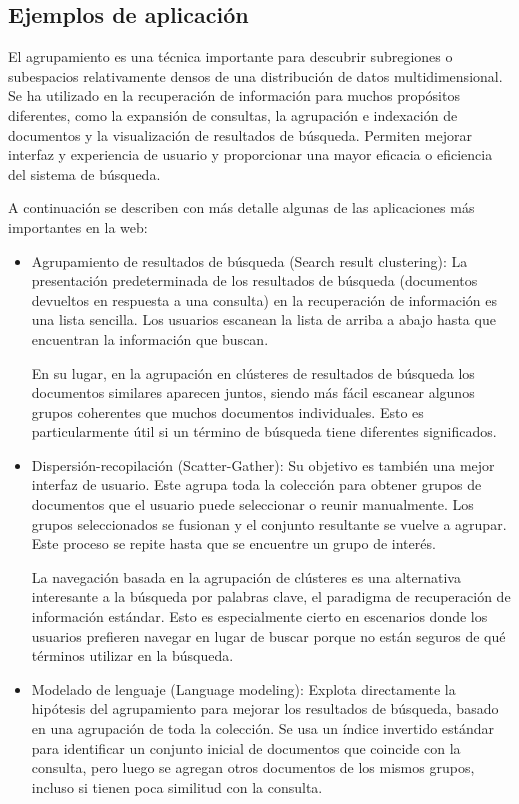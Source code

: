 \documentclass{llncs}
\begin{document}
\subsection{Ejemplos de aplicaci\'on} 
El agrupamiento es una técnica importante para descubrir subregiones o subespacios relativamente densos de una distribución de datos multidimensional. Se ha utilizado en la recuperación de información para muchos propósitos diferentes, como la expansión de consultas, la agrupación e indexación de documentos y la visualización de resultados de búsqueda. Permiten mejorar interfaz y experiencia de usuario y proporcionar una mayor eficacia o eficiencia del sistema de búsqueda. 

A continuaci\'on se describen con m\'as detalle algunas de las aplicaciones m\'as importantes en la web:
\begin{itemize}
	\item Agrupamiento de resultados de búsqueda (Search result clustering): La presentación predeterminada de los resultados de búsqueda (documentos devueltos en respuesta a una consulta) en la recuperación de información es una lista sencilla. Los usuarios escanean la lista de arriba a abajo hasta que encuentran la información que buscan. 
	
	En su lugar, en la agrupación en clústeres de resultados de búsqueda los documentos similares aparecen juntos, siendo más fácil escanear algunos grupos coherentes que muchos documentos individuales. Esto es particularmente útil si un término de búsqueda tiene diferentes significados.
	
	\item Dispersión-recopilación (Scatter-Gather): Su objetivo es tambi\'en una mejor interfaz de usuario. Este agrupa toda la colección para obtener grupos de documentos que el usuario puede seleccionar o reunir manualmente. Los grupos seleccionados se fusionan y el conjunto resultante se vuelve a agrupar. Este proceso se repite hasta que se encuentre un grupo de interés.
	
	La navegación basada en la agrupaci\'on de clústeres es una alternativa interesante a la búsqueda por palabras clave, el paradigma de recuperación de información estándar. Esto es especialmente cierto en escenarios donde los usuarios prefieren navegar en lugar de buscar porque no están seguros de qué términos utilizar en la búsqueda.
	
	\item Modelado de lenguaje (Language modeling): Explota directamente la hipótesis del agrupamiento para mejorar los resultados de búsqueda, basado en una agrupación de toda la colección. Se usa un índice invertido estándar para identificar un conjunto inicial de documentos que coincide con la consulta, pero luego se agregan otros documentos de los mismos grupos, incluso si tienen poca similitud con la consulta. 
	

\end{itemize}
\end{document}
